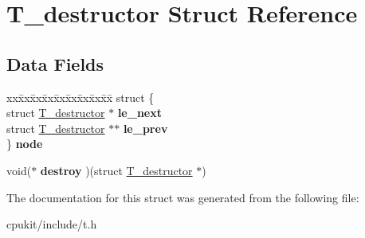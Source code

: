 \hypertarget{structT__destructor}{}\section{T\+\_\+destructor Struct Reference}
\label{structT__destructor}
\subsection*{Data Fields}
\begin{DoxyCompactItemize}
\item 
\mbox{\label{structT__destructor_a5f24d7247087588e22576e0b38663583}} 
\begin{tabbing}
xx\=xx\=xx\=xx\=xx\=xx\=xx\=xx\=xx\=\kill
struct \{\\
\>struct \mbox{\hyperlink{structT__destructor}{T\_destructor}} $\ast$ {\bfseries le\_next}\\
\>struct \mbox{\hyperlink{structT__destructor}{T\_destructor}} $\ast$$\ast$ {\bfseries le\_prev}\\
\} {\bfseries node}\\

\end{tabbing}\item 
\mbox{\label{structT__destructor_a015e4914e9f7a686f490dbbc81797d53}} 
void($\ast$ {\bfseries destroy} )(struct \mbox{\hyperlink{structT__destructor}{T\+\_\+destructor}} $\ast$)
\end{DoxyCompactItemize}


The documentation for this struct was generated from the following file\+:\begin{DoxyCompactItemize}
\item 
cpukit/include/t.\+h\end{DoxyCompactItemize}
